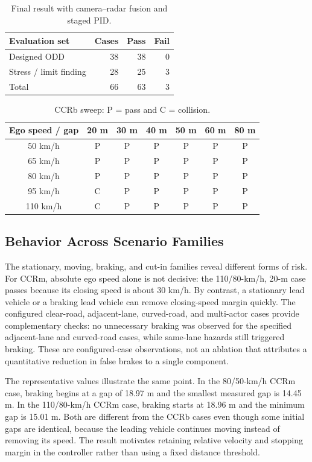 \documentclass[conference]{IEEEtran}
\begin{document}
\begin{table}[t]
\caption{Final result with camera--radar fusion and staged PID.}
\label{tab:results}
\centering
\footnotesize
\begin{tabular}{lrrr}
\toprule
Evaluation set & Cases & Pass & Fail \\
\midrule
Designed ODD & 38 & 38 & 0 \\
Stress / limit finding & 28 & 25 & 3 \\
\midrule
Total & 66 & 63 & 3 \\
\bottomrule
\end{tabular}
\end{table}

\begin{table}[t]
\caption{CCRb sweep: P = pass and C = collision.}
\label{tab:ccrb_sweep}
\centering
\footnotesize
\begin{tabular}{c*{6}{c}}
\toprule
Ego speed / gap & 20 m & 30 m & 40 m & 50 m & 60 m & 80 m \\
\midrule
50 km/h  & P & P & P & P & P & P \\
65 km/h  & P & P & P & P & P & P \\
80 km/h  & P & P & P & P & P & P \\
95 km/h  & C & P & P & P & P & P \\
110 km/h & C & P & P & P & P & P \\
\bottomrule
\end{tabular}
\end{table}

\subsection{Behavior Across Scenario Families}
The stationary, moving, braking, and cut-in families reveal different forms of
risk. For CCRm, absolute ego speed alone is not decisive: the 110/80-km/h,
20-m case passes because its closing speed is about 30 km/h. By contrast, a
stationary lead vehicle or a braking lead vehicle can remove closing-speed margin
quickly. The configured clear-road, adjacent-lane, curved-road, and multi-actor
cases provide complementary checks: no unnecessary braking was observed for the
specified adjacent-lane and curved-road cases, while same-lane hazards still
triggered braking. These are configured-case observations, not an ablation that
attributes a quantitative reduction in false brakes to a single component.

The representative values illustrate the same point. In the 80/50-km/h CCRm
case, braking begins at a gap of 18.97 m and the smallest measured gap is
14.45 m. In the 110/80-km/h CCRm case, braking starts at 18.96 m and the minimum
gap is 15.01 m. Both are different from the CCRb cases even though some initial
gaps are identical, because the leading vehicle continues moving instead of
removing its speed. The result motivates retaining relative velocity and stopping
margin in the controller rather than using a fixed distance threshold.
\end{document}
